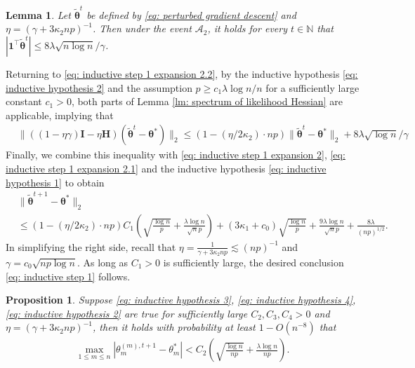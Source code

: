 \documentclass[letterpaper,12pt]{article}
\numberwithin{equation}{section}
\theoremstyle{plain}
\numberwithin{Theorem}{section}
\numberwithin{corollary}{section}
\newtheorem{proposition}{Proposition}
\numberwithin{proposition}{section}
\newtheorem{Lemma}{Lemma}
\numberwithin{Lemma}{section}
{
	\theoremstyle{definition}
	\newtheorem{Definition}{Definition}
	\newtheorem{example}{Example}
	\numberwithin{example}{section}
	\newtheorem{fact}{Fact}
	\numberwithin{fact}{section}
	\newtheorem{remark}{Remark}
}
\newcommand{\1}{\mathbbm{1}}
\def\bth{{\boldsymbol{\theta}}}
\begin{document}
	\begin{Lemma}\label{lm: elementwise sum of perturbed gradient descent}
		Let $\widetilde\bth^t$ be defined by \eqref{eq: perturbed gradient descent} and $\eta = (\gamma + 3\kappa_2 np)^{-1}$. Then under the event $\mathcal A_2$, it holds for every $t \in \mathbb N$ that $|\bm 1^\top \widetilde \bth^t| \leq 8\lambda\sqrt{n\log n}/\gamma$.
	\end{Lemma}
	
	
	Returning to \eqref{eq: inductive step 1 expansion 2.2}, by the inductive hypothesis \eqref{eq: inductive hypothesis 2} and the assumption $p \geq c_1\lambda \log n/n$ for a sufficiently large constant $c_1 > 0$, both parts of Lemma \ref{lm: spectrum of likelihood Hessian} are applicable, implying that
	\begin{align*}
		&\|((1-\eta\gamma)\bm I - \eta\bm H) (\widetilde\bth^t - \bth^*)\|_2 \leq (1- (\eta/2\kappa_2) \cdot np) \|\widetilde\bth^t - \bth^*\|_2 + 8\lambda\sqrt{\log n}/\gamma
	\end{align*}
	Finally, we combine this inequality with \eqref{eq: inductive step 1 expansion 2}, \eqref{eq: inductive step 1 expansion 2.1} and the inductive hypothesis \eqref{eq: inductive hypothesis 1} to obtain
	\begin{align*}
		&\|\widetilde\bth^{t+1} - \bth^*\|_2 \\
		&\leq (1- (\eta/2\kappa_2) \cdot np)C_1\left(\sqrt{\frac{\log n}{p}} + \frac{\lambda\log n}{\sqrt{n}p}\right) + (3\kappa_1+c_0)\sqrt{\frac{\log n}{p}} + \frac{9\lambda\log n}{\sqrt{n}p} + \frac{8\lambda}{(np)^{1/2}}.
	\end{align*}
	In simplifying the right side, recall that $\eta = \frac{1}{\gamma + 3\kappa_2 np} \lesssim (np)^{-1}$ and $\gamma = c_0\sqrt{np\log n}$. As long as $C_1 > 0$ is sufficiently large, the desired conclusion \eqref{eq: inductive step 1} follows.


\begin{proposition}\label{prop: inductive step 3}
	Suppose \eqref{eq: inductive hypothesis 3}, \eqref{eq: inductive hypothesis 4}, \eqref{eq: inductive hypothesis 2} are true for sufficiently large $C_2, C_3, C_4 > 0$ and $\eta = (\gamma + 3\kappa_2 np)^{-1}$, then it holds with probability at least $1 - O(n^{-8})$ that
	\begin{align}
		\max_{1 \leq m \leq n} |\theta^{(m), t+1}_m - \theta^*_m| < C_2 \left(\sqrt{\frac{\log n}{np}} + \frac{\lambda\log n}{np}\right). \label{eq: inductive step 3}
	\end{align}
\end{proposition}
\end{document}
